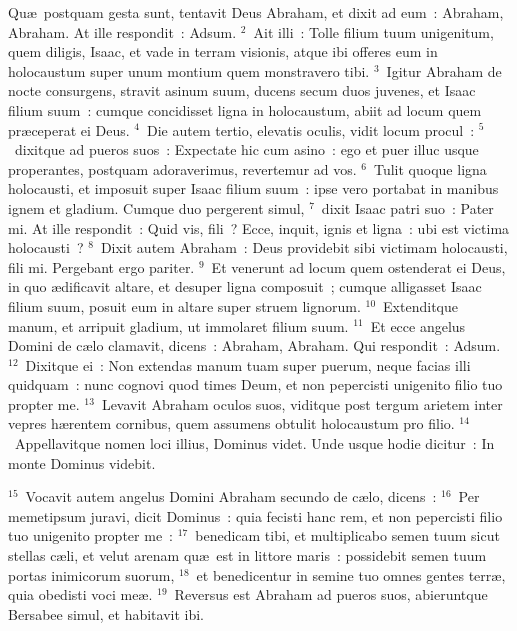 \lettrine[lines=3,image=true,loversize=0.05,lraise=-0.03]{Q}{}u\ae\ postquam gesta sunt, tentavit Deus Abraham, et dixit ad eum~: Abraham, Abraham. At ille respondit~: Adsum.
${}^{2}$~Ait illi~: Tolle filium tuum unigenitum, quem diligis, Isaac, et vade in terram visionis, atque ibi offeres eum in holocaustum super unum montium quem monstravero tibi.
${}^{3}$~Igitur Abraham de nocte consurgens, stravit asinum suum, ducens secum duos juvenes, et Isaac filium suum~: cumque concidisset ligna in holocaustum, abiit ad locum quem pr\ae ceperat ei Deus.
${}^{4}$~Die autem tertio, elevatis oculis, vidit locum procul~:
${}^{5}$~dixitque ad pueros suos~: Expectate hic cum asino~: ego et puer illuc usque properantes, postquam adoraverimus, revertemur ad vos.
${}^{6}$~Tulit quoque ligna holocausti, et imposuit super Isaac filium suum~: ipse vero portabat in manibus ignem et gladium. Cumque duo pergerent simul,
${}^{7}$~dixit Isaac patri suo~: Pater mi. At ille respondit~: Quid vis, fili~? Ecce, inquit, ignis et ligna~: ubi est victima holocausti~?
${}^{8}$~Dixit autem Abraham~: Deus providebit sibi victimam holocausti, fili mi. Pergebant ergo pariter.
${}^{9}$~Et venerunt ad locum quem ostenderat ei Deus, in quo \ae dificavit altare, et desuper ligna composuit~; cumque alligasset Isaac filium suum, posuit eum in altare super struem lignorum.
${}^{10}$~Extenditque manum, et arripuit gladium, ut immolaret filium suum.
${}^{11}$~Et ecce angelus Domini de c\ae lo clamavit, dicens~: Abraham, Abraham. Qui respondit~: Adsum.
${}^{12}$~Dixitque ei~: Non extendas manum tuam super puerum, neque facias illi quidquam~: nunc cognovi quod times Deum, et non pepercisti unigenito filio tuo propter me.
${}^{13}$~Levavit Abraham oculos suos, viditque post tergum arietem inter vepres h\ae rentem cornibus, quem assumens obtulit holocaustum pro filio.
${}^{14}$~Appellavitque nomen loci illius, Dominus videt. Unde usque hodie dicitur~: In monte Dominus videbit.


${}^{15}$~Vocavit autem angelus Domini Abraham secundo de c\ae lo, dicens~:
${}^{16}$~Per memetipsum juravi, dicit Dominus~: quia fecisti hanc rem, et non pepercisti filio tuo unigenito propter me~:
${}^{17}$~benedicam tibi, et multiplicabo semen tuum sicut stellas c\ae li, et velut arenam qu\ae\ est in littore maris~: possidebit semen tuum portas inimicorum suorum,
${}^{18}$~et benedicentur in semine tuo omnes gentes terr\ae , quia obedisti voci me\ae .
${}^{19}$~Reversus est Abraham ad pueros suos, abieruntque Bersabee simul, et habitavit ibi.


